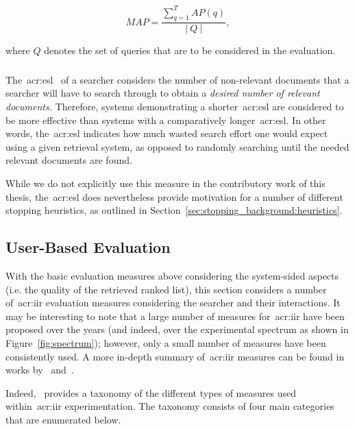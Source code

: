 \begin{equation*}
MAP = \frac{\sum^{T}_{q=1} AP(q)}{|~Q~|},
\end{equation*}

where $Q$ denotes the set of queries that are to be considered in the evaluation.

\subsubsection{}\label{sec:ir_background:evaluation:system:esl}
The~\gls{acr:esl}~\citep{cooper1968expected_search_length} of a searcher considers the number of non-relevant documents that a searcher will have to search through to obtain a \emph{desired number of relevant documents.} Therefore, systems demonstrating a shorter~\gls{acr:esl} are considered to be more effective than systems with a comparatively longer~\gls{acr:esl}. In other words, the~\gls{acr:esl} indicates how much wasted search effort one would expect using a given retrieval system, as opposed to randomly searching until the needed relevant documents are found.

While we do not explicitly use this measure in the contributory work of this thesis, the~\gls{acr:esl} does nevertheless provide motivation for a number of different stopping heuristics, as outlined in Section~\ref{sec:stopping_background:heuristics}.

\subsection{User-Based Evaluation}\label{sec:ir_background:evaluation:user}
With the basic evaluation measures above considering the system-sided aspects (i.e. the quality of the retrieved ranked list), this section considers a number of~\gls{acr:iir} evaluation measures considering the searcher and their interactions. It may be interesting to note that a large number of measures for~\gls{acr:iir} have been proposed over the years (and indeed, over the experimental spectrum as shown in Figure~\ref{fig:spectrum}); however, only a small number of measures have been consistently used. A more in-depth summary of~\gls{acr:iir} measures can be found in works by~\cite{su1992iir_measures} and~\cite{kelly2009iir}.

Indeed,~\cite{kelly2009iir} provides a taxonomy of the different types of measures used within~\gls{acr:iir} experimentation. The taxonomy consists of four main categories that are enumerated below.

